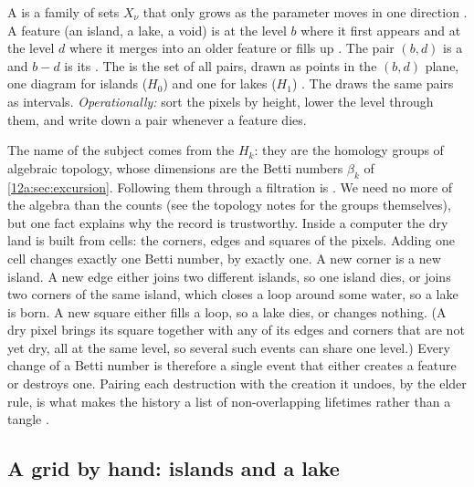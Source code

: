 \begin{workdef}
A  is a family of sets $X_\nu$ that only grows as the parameter moves in one direction
. A feature (an island,
a lake, a void) is  at the level $b$ where it first appears and  at the level $d$
where it merges into an older feature or fills up . The pair $(b,d)$ is a  and $b-d$ is its . The
 is the set of all pairs, drawn as points in the $(b,d)$ plane, one diagram for
islands ($H_0$) and one for lakes ($H_1$) . The  draws the same pairs as intervals.
\emph{Operationally:} sort the pixels by height, lower the level through them, and write down a pair whenever
a feature dies.
\end{workdef}

The name of the subject comes from the $H_k$: they are the homology groups of algebraic topology, whose
dimensions are the Betti numbers $\beta_k$ of \cref{12a:sec:excursion}. Following them through a filtration is
 \cite{Edelsbrunner2002}. We need no more of the algebra than the counts
(see the topology notes for the groups themselves), but one fact explains why the record is
trustworthy. Inside a computer the dry land is built from cells: the corners, edges and squares of the pixels.
Adding one cell changes exactly one Betti number, by exactly one. A new corner is a new island. A new edge either
joins two different islands, so one island dies, or joins two corners of the same island, which closes a loop
around some water, so a lake is born. A new square either fills a loop, so a lake dies, or changes nothing.
(A dry pixel brings its square together with any of its edges and corners that are not yet dry, all at the
same level, so several such events can share one level.) Every change of a Betti number is therefore a single
event that either creates a feature or destroys one. Pairing each destruction with the creation it undoes, by
the elder rule, is what makes the history a list of
non-overlapping lifetimes rather than a tangle \cite{Edelsbrunner2002,Otter2017}.

\subsection{A grid by hand: islands and a lake}
\label{12b:sec:grid}


